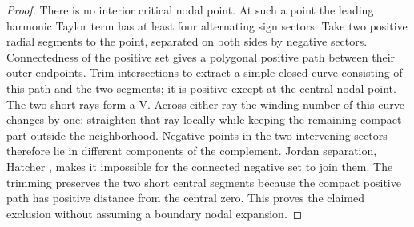 \documentclass[11pt]{article}
\theoremstyle{definition}
\theoremstyle{remark}
\numberwithin{equation}{section}
\begin{document}
\begin{proof}
There is no interior critical nodal point. At such a point the leading harmonic Taylor term has at least four alternating sign sectors. Take two positive radial segments to the point, separated on both sides by negative sectors. Connectedness of the positive set gives a polygonal positive path between their outer endpoints. Trim intersections to extract a simple closed curve consisting of this path and the two segments; it is positive except at the central nodal point. The two short rays form a V. Across either ray the winding number of this curve changes by one: straighten that ray locally while keeping the remaining compact part outside the neighborhood. Negative points in the two intervening sectors therefore lie in different components of the complement. Jordan separation, Hatcher \cite[Proposition~2B.1(b)]{HatcherAT}, makes it impossible for the connected negative set to join them. The trimming preserves the two short central segments because the compact positive path has positive distance from the central zero. This proves the claimed exclusion without assuming a boundary nodal expansion.

\end{proof}
\end{document}
